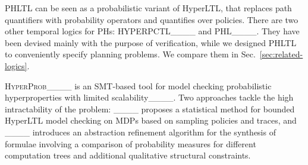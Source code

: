 \acs{PHLTL} can be seen as a probabilistic variant of HyperLTL,
that replaces path quantifiers with probability operators and quantifies over policies.
There are two other temporal logics for \acp{PH}:
\acs{HYPERPCTL}____ and \acs{PHL}____.
They have been devised mainly with the purpose of verification,
while we designed \acs{PHLTL} to conveniently specify planning problems.
We compare them in Sec.~\ref{sec:related-logics}.

\textsc{HyperProb}____ is an SMT-based tool for model checking probabilistic hyperproperties with limited scalability____.
Two approaches tackle the high intractability of the problem:
____ proposes a statistical method for bounded HyperLTL model checking on \acp{MDP} based on sampling policies and traces,
and ____ introduces an abstraction refinement algorithm for the synthesis of formulae involving a comparison of probability measures for different computation trees and additional qualitative structural constraints.